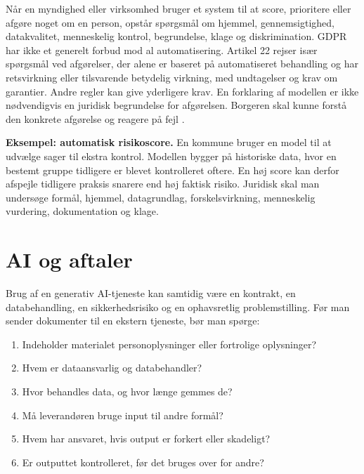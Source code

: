 Når en myndighed eller virksomhed bruger et system til at score, prioritere eller afgøre noget om en person, opstår spørgsmål om hjemmel, gennemsigtighed, datakvalitet, menneskelig kontrol, begrundelse, klage og diskrimination. GDPR har ikke et generelt forbud mod al automatisering. Artikel 22 rejser især spørgsmål ved afgørelser, der alene er baseret på automatiseret behandling og har retsvirkning eller tilsvarende betydelig virkning, med undtagelser og krav om garantier. Andre regler kan give yderligere krav. En forklaring af modellen er ikke nødvendigvis en juridisk begrundelse for afgørelsen. Borgeren skal kunne forstå den konkrete afgørelse og reagere på fejl \citep{gdpr}.

\begin{examplebox}
\textbf{Eksempel: automatisk risikoscore.} En kommune bruger en model til at udvælge sager til ekstra kontrol. Modellen bygger på historiske data, hvor en bestemt gruppe tidligere er blevet kontrolleret oftere. En høj score kan derfor afspejle tidligere praksis snarere end høj faktisk risiko. Juridisk skal man undersøge formål, hjemmel, datagrundlag, forskelsvirkning, menneskelig vurdering, dokumentation og klage.
\end{examplebox}

\section{AI og aftaler}

Brug af en generativ AI-tjeneste kan samtidig være en kontrakt, en databehandling, en sikkerhedsrisiko og en ophavsretlig problemstilling. Før man sender dokumenter til en ekstern tjeneste, bør man spørge:
\begin{enumerate}
  \item Indeholder materialet personoplysninger eller fortrolige oplysninger?
  \item Hvem er dataansvarlig og databehandler?
  \item Hvor behandles data, og hvor længe gemmes de?
  \item Må leverandøren bruge input til andre formål?
  \item Hvem har ansvaret, hvis output er forkert eller skadeligt?
  \item Er outputtet kontrolleret, før det bruges over for andre?
\end{enumerate}



